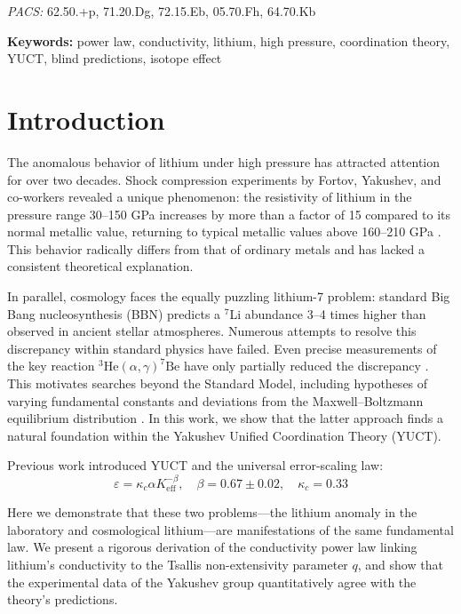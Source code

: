 \documentclass[12pt,a4paper]{article}
\theoremstyle{remark}
\newcommand{\Ke}{K_{\mathrm{eff}}}
\newcommand{\kappac}{\kappa_c}
\newcommand{\alp}{\alpha}
\newcommand{\pacs}{\textit{PACS:} 62.50.+p, 71.20.Dg, 72.15.Eb, 05.70.Fh, 64.70.Kb}
\begin{document}
\begin{titlepage}
\begin{center}
			\vspace{0.5cm}
			\noindent \pacs
			
			\vspace{0.5cm}
			\noindent \textbf{Keywords:} power law, conductivity, lithium, high pressure, coordination theory, YUCT, blind predictions, isotope effect
		\end{center}
	\end{titlepage}
	
	\tableofcontents
	\newpage
	
	\section{Introduction}
	
	The anomalous behavior of lithium under high pressure has attracted attention for over two decades. Shock compression experiments by Fortov, Yakushev, and co-workers \cite{fortov2001, yakushev2002, fortov1999} revealed a unique phenomenon: the resistivity of lithium in the pressure range 30–150 GPa increases by more than a factor of 15 compared to its normal metallic value, returning to typical metallic values above 160–210 GPa \cite{fortov2001, yakushev2002}. This behavior radically differs from that of ordinary metals and has lacked a consistent theoretical explanation.
	
	In parallel, cosmology faces the equally puzzling lithium-7 problem: standard Big Bang nucleosynthesis (BBN) predicts a \(^7\)Li abundance 3–4 times higher than observed in ancient stellar atmospheres. Numerous attempts to resolve this discrepancy within standard physics have failed. Even precise measurements of the key reaction \(^3\mathrm{He}(\alpha,\gamma)^7\mathrm{Be}\) have only partially reduced the discrepancy \cite{IAEA2017}. This motivates searches beyond the Standard Model, including hypotheses of varying fundamental constants \cite{HAL2006} and deviations from the Maxwell–Boltzmann equilibrium distribution \cite{bertulani2015}. In this work, we show that the latter approach finds a natural foundation within the Yakushev Unified Coordination Theory (YUCT).
	
	Previous work \cite{yuct2026, appendixL, appendixC} introduced YUCT and the universal error-scaling law:
	\begin{equation}
		\varepsilon = \kappac \alp \Ke^{-\beta}, \quad \beta = 0.67 \pm 0.02, \quad \kappac = 0.33
		\label{eq:universal}
	\end{equation}
	
	Here we demonstrate that these two problems—the lithium anomaly in the laboratory and cosmological lithium—are manifestations of the same fundamental law. We present a rigorous derivation of the conductivity power law linking lithium's conductivity to the Tsallis non-extensivity parameter \(q\), and show that the experimental data of the Yakushev group \cite{fortov2001, yakushev2002} quantitatively agree with the theory's predictions.
	
\end{document}
